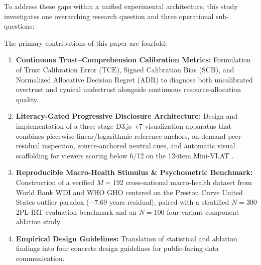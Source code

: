 \documentclass[conference]{IEEEtran}
\newcommand{\TCE}{\mathrm{TCE}}
\newcommand{\SCB}{\mathrm{SCB}}
\newcommand{\ADR}{\mathrm{ADR}}
\newcommand{\WdiM}{192}
\newcommand{\UsaLeResid}{-7.69}
\begin{document}
To address these gaps within a unified experimental architecture, this study investigates one overarching research question and three operational sub-questions:

\medskip
\noindent{}
\medskip

The primary contributions of this paper are fourfold:
\begin{enumerate}
\item \textbf{Continuous Trust--Comprehension Calibration Metrics:} Formulation of Trust Calibration Error ($\TCE$), Signed Calibration Bias ($\SCB$), and Normalized Allocative Decision Regret ($\ADR$) to diagnose both uncalibrated overtrust and cynical undertrust alongside continuous resource-allocation quality.
\item \textbf{Literacy-Gated Progressive Disclosure Architecture:} Design and implementation of a three-stage D3.js~v7 visualization apparatus \cite{bostock2011} that combines piecewise-linear/logarithmic reference anchors, on-demand peer-residual inspection, source-anchored neutral cues, and automatic visual scaffolding for viewers scoring below 6/12 on the 12-item Mini-VLAT \cite{pandey2023}.
\item \textbf{Reproducible Macro-Health Stimulus \& Psychometric Benchmark:} Construction of a verified $M = \WdiM$ cross-national macro-health dataset from World Bank WDI \cite{worldbank} and WHO GHO \cite{whogho} centered on the Preston Curve United States outlier paradox ($\UsaLeResid$ years residual), paired with a stratified $N = 300$ 2PL-IRT evaluation benchmark and an $N = 100$ four-variant component ablation study.
\item \textbf{Empirical Design Guidelines:} Translation of statistical and ablation findings into four concrete design guidelines for public-facing data communication.
\end{enumerate}
\end{document}
